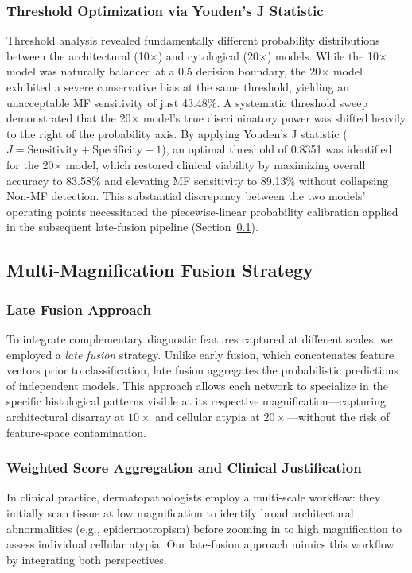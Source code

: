 \documentclass[conference]{IEEEtran}
\begin{document}
\subsubsection{Threshold Optimization via Youden's J Statistic}
Threshold analysis revealed fundamentally different probability distributions between the architectural (10$\times$) and cytological (20$\times$) models. While the 10$\times$ model was naturally balanced at a 0.5 decision boundary, the 20$\times$ model exhibited a severe conservative bias at the same threshold, yielding an unacceptable MF sensitivity of just 43.48\%. A systematic threshold sweep demonstrated that the 20$\times$ model's true discriminatory power was shifted heavily to the right of the probability axis. By applying Youden's J statistic ($J = \text{Sensitivity} + \text{Specificity} - 1$), an optimal threshold of 0.8351 was identified for the 20$\times$ model, which restored clinical viability by maximizing overall accuracy to 83.58\% and elevating MF sensitivity to 89.13\% without collapsing Non-MF detection. This substantial discrepancy between the two models' operating points necessitated the piecewise-linear probability calibration applied in the subsequent late-fusion pipeline (Section~\ref{sec:fusion}).

\subsection{Multi-Magnification Fusion Strategy}\label{sec:fusion}

\subsubsection{Late Fusion Approach}
To integrate complementary diagnostic features captured at different scales, we employed a \textit{late fusion} strategy. Unlike early fusion, which concatenates feature vectors prior to classification, late fusion aggregates the probabilistic predictions of independent models. This approach allows each network to specialize in the specific histological patterns visible at its respective magnification—capturing architectural disarray at $10\times$ and cellular atypia at $20\times$—without the risk of feature-space contamination.

\subsubsection{Weighted Score Aggregation and Clinical Justification}
In clinical practice, dermatopathologists employ a multi-scale workflow: they initially scan tissue at low magnification to identify broad architectural abnormalities (e.g., epidermotropism) before zooming in to high magnification to assess individual cellular atypia. Our late-fusion approach mimics this workflow by integrating both perspectives.
\end{document}
